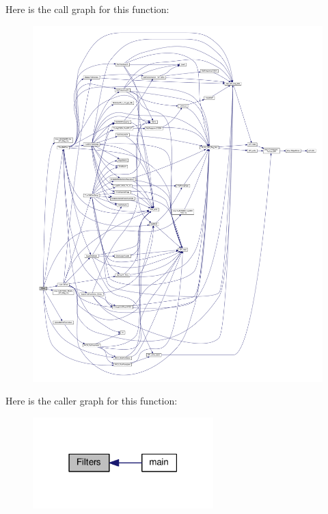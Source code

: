 Here is the call graph for this function\+:
\nopagebreak
\begin{figure}[H]
\begin{center}
\leavevmode
\includegraphics[width=350pt]{dd/d0b/mcu__program_2host__src_2main_8cpp_ad4dcf2055b7114f8eacfa8cb11e5bbd5_cgraph}
\end{center}
\end{figure}




Here is the caller graph for this function\+:
\nopagebreak
\begin{figure}[H]
\begin{center}
\leavevmode
\includegraphics[width=198pt]{dd/d0b/mcu__program_2host__src_2main_8cpp_ad4dcf2055b7114f8eacfa8cb11e5bbd5_icgraph}
\end{center}
\end{figure}



